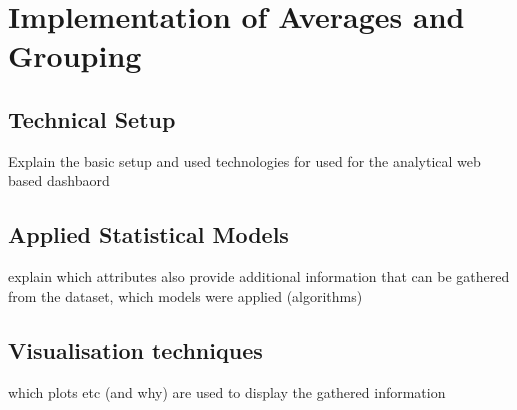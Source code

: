 %
%
% 
% 
% 

\chapter{Implementation of Averages and Grouping}
\label{chap:analytical_dashboard}


\section{Technical Setup}
Explain the basic setup and used technologies for used for the analytical web based dashbaord 


\section{Applied Statistical Models}
explain which attributes also provide additional information that can be gathered from the dataset, which models were applied (algorithms) 

\section{Visualisation techniques}
which plots etc (and why) are used to display the gathered information 

